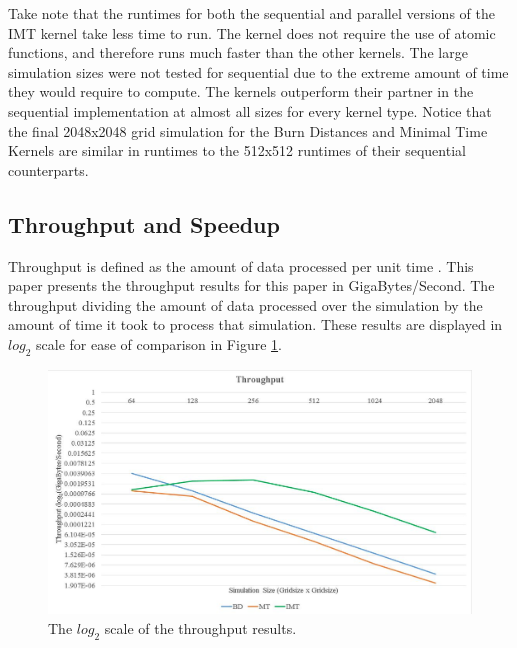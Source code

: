 Take note that the runtimes for both the sequential and parallel versions of the IMT kernel take less time to run. The kernel does not require the use of atomic functions, and therefore runs much faster than the other kernels. The large simulation sizes were not tested for sequential due to the extreme amount of time they would require to compute. The kernels outperform their partner in the sequential implementation at almost all sizes for every kernel type. Notice that the final 2048x2048 grid simulation for the Burn Distances and Minimal Time Kernels are similar in runtimes to the 512x512 runtimes of their sequential counterparts. 

\subsection*{Throughput and Speedup}
Throughput is defined as the amount of data processed per unit time \cite{cuda}. This paper presents the throughput results for this paper in GigaBytes/Second. The throughput dividing the amount of data processed over the simulation by the amount of time it took to process that simulation. These results are displayed in $log_2$ scale for ease of comparison in Figure \ref{fig:throughput}.
\begin{figure}[H]
\centering
  \includegraphics[width=\textwidth]{figures/results/throughput.JPG}
  \caption{The $log_2$ scale of the throughput results.}
  \label{fig:throughput}
\end{figure} 

